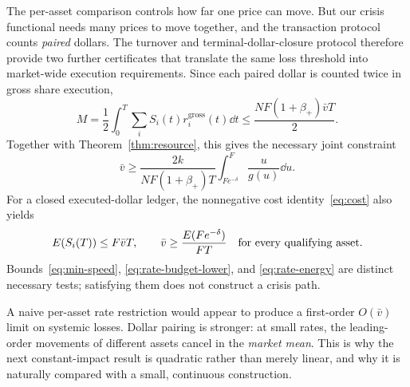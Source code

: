 \documentclass[review,hidelinks,onefignum,onetabnum]{siamonline250211}
\begin{document}
The per-asset comparison controls how far one price can move. But our crisis functional needs many prices to move together, and the transaction protocol counts \emph{paired} dollars. The turnover and terminal-dollar-closure protocol therefore provide two further certificates that translate the same loss threshold into market-wide execution requirements. Since each paired dollar is counted twice in gross share execution,
\begin{equation}\label{eq:rate-turnover}
 M=\frac12\int_0^T\sum_i S_i(t)r_i^{\mathrm{gross}}(t)\dd t
 \le\frac{NF(1+\beta_+)\bar v T}{2}.
\end{equation}
Together with Theorem~\ref{thm:resource}, this gives the necessary joint constraint
\begin{equation}\label{eq:rate-budget-lower}
 \boxed{\ \bar v\ge\frac{2k}{NF(1+\beta_+)T}
 \int_{Fe^{-\delta}}^F\frac{u}{g(u)}\dd u.\ }
\end{equation}
For a closed executed-dollar ledger, the nonnegative cost identity~\eqref{eq:cost} also yields
\begin{equation}\label{eq:rate-energy}
 E(S_i(T))\le F\bar v T,\qquad
 \bar v\ge \frac{E(Fe^{-\delta})}{FT}
 \quad \hbox{for every qualifying asset.}
\end{equation}
Bounds~\eqref{eq:min-speed}, \eqref{eq:rate-budget-lower}, and \eqref{eq:rate-energy} are distinct necessary tests; satisfying them does not construct a crisis path.

A naive per-asset rate restriction would appear to produce a first-order $O(\bar v)$ limit on systemic losses. Dollar pairing is stronger: at small rates, the leading-order movements of different assets cancel in the \emph{market mean}. This is why the next constant-impact result is quadratic rather than merely linear, and why it is naturally compared with a small, continuous construction.
\end{document}
